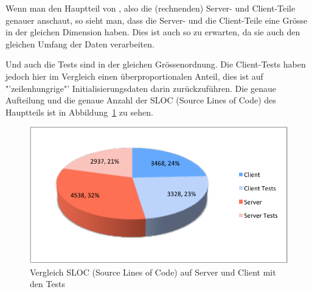 	Wenn man den Hauptteil von \eeppi, also die (rechnenden) Server- und Client-Teile genauer anschaut,
	so sieht man, dass die Server- und die Client-Teile eine Grösse in der gleichen Dimension haben.
	Dies ist auch so zu erwarten, da sie auch den gleichen Umfang der Daten verarbeiten.
	
	Und auch die Tests sind in der gleichen Grössenordnung.
	Die Client-Tests haben jedoch hier im Vergleich einen überproportionalen Anteil,
	dies ist auf "'zeilenhungrige"' Initialisierungsdaten darin zurückzuführen.
	Die genaue Aufteilung und die genaue Anzahl der SLOC (Source Lines of Code) des Hauptteils ist in Abbildung\ \ref{fig:serverClientSLOC} zu sehen.
	\begin{figure}[H]
		\includegraphics[width=\largeThird\textwidth]{projectPlan/media/img/serverClientSLOC.pdf}
		\centering
		\caption{Vergleich SLOC (Source Lines of Code) auf Server und Client mit den Tests}
		\label{fig:serverClientSLOC}
	\end{figure}

